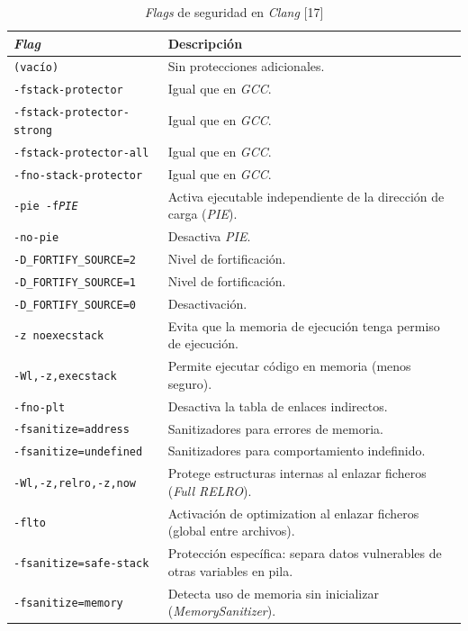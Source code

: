 \begin{table}[H]
\centering
\footnotesize
\begin{tabularx}{\linewidth}{|l|Y|}
\hline
\textbf{\emph{Flag}} & \textbf{Descripción} \\
\hline
\texttt{(vacío)} & Sin protecciones adicionales. \\
\texttt{-fstack-protector} & Igual que en \emph{GCC}. \\
\texttt{-fstack-protector-strong} & Igual que en \emph{GCC}. \\
\texttt{-fstack-protector-all} & Igual que en \emph{GCC}. \\
\texttt{-fno-stack-protector} & Igual que en \emph{GCC}. \\
\texttt{-pie -f\emph{PIE}} & Activa ejecutable independiente de la dirección de carga (\emph{PIE}). \\
\texttt{-no-pie} & Desactiva \emph{PIE}. \\
\texttt{-D\_FORTIFY\_SOURCE=2} & Nivel de fortificación. \\
\texttt{-D\_FORTIFY\_SOURCE=1} & Nivel de fortificación. \\
\texttt{-D\_FORTIFY\_SOURCE=0} & Desactivación. \\
\texttt{-z noexecstack} & Evita que la memoria de ejecución tenga permiso de ejecución. \\
\texttt{-Wl,-z,execstack} & Permite ejecutar código en memoria (menos seguro). \\
\texttt{-fno-plt} & Desactiva la tabla de enlaces indirectos. \\
\texttt{-fsanitize=address} & Sanitizadores para errores de memoria. \\
\texttt{-fsanitize=undefined} & Sanitizadores para comportamiento indefinido. \\
\texttt{-Wl,-z,relro,-z,now} & Protege estructuras internas al enlazar ficheros (\emph{Full RELRO}). \\
\texttt{-flto} & Activación de optimization al enlazar ficheros (global entre archivos). \\
\texttt{-fsanitize=safe-stack} & Protección específica: separa datos vulnerables de otras variables en pila. \\
\texttt{-fsanitize=memory} & Detecta uso de memoria sin inicializar (\emph{MemorySanitizer}). \\
\hline
\end{tabularx}
\caption{\emph{Flags} de seguridad en \emph{Clang} [17]}
\label{tab:clang_seguridad}
\end{table}


